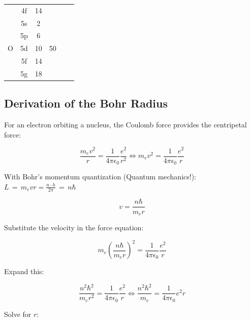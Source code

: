 \documentclass[
	a4paper,
	parskip=half,
    pagesize=auto,      		%
    listof=totoc,   		%
    bibliography=totoc,
	11pt
]{scrartcl}
\begin{document}
\begin{table}[htp]
\begin{tabular}{cccccc}
		& 4f & 14 &                     & \multicolumn{1}{l}{} & \multicolumn{1}{l}{} \\
		\multirow{5}{*}{O} & 5s & 2  & \multirow{5}{*}{50} & \multicolumn{1}{l}{} & \multicolumn{1}{l}{} \\ \addlinespace
		& 5p & 6  &                     & \multicolumn{1}{l}{} & \multicolumn{1}{l}{} \\
		& 5d & 10 &                     & \multicolumn{1}{l}{} & \multicolumn{1}{l}{} \\
		& 5f & 14 &                     & \multicolumn{1}{l}{} & \multicolumn{1}{l}{} \\
		& 5g & 18 &                     & \multicolumn{1}{l}{} & \multicolumn{1}{l}{} \\ \bottomrule 
	\end{tabular}
\end{table}

\subsection{Derivation of the Bohr Radius} \label{ch:bohr-eq}

For an electron orbiting a nucleus, the Coulomb force provides the centripetal force:

\begin{equation}
	\frac{m_e v^2}{r} = \frac{1}{4\pi\epsilon_0}\frac{e^2}{r^2} \iff m_e v^2 = \frac{1}{4\pi\epsilon_0}\frac{e^2}{r}
\end{equation}


With Bohr's momentum quantization (Quantum mechanics!): $L \, = \, m_e v r = \frac{n \cdot h}{2 \pi} \, = \, n \hbar$


\begin{equation}
	v = \frac{n\hbar}{m_e r}
\end{equation}

Substitute the velocity in the force equation:

\begin{equation}
	m_e \left(\frac{n\hbar}{m_e r}\right)^2
	=
	\frac{1}{4\pi\epsilon_0}\frac{e^2}{r}
\end{equation}

Expand this:

\begin{equation}
	\frac{n^2 \hbar^2}{m_e r^2}
	=
	\frac{1}{4\pi\epsilon_0}\frac{e^2}{r} \iff \frac{n^2 \hbar^2}{m_e}
	=
	\frac{1}{4\pi\epsilon_0} e^2 r
\end{equation}

Solve for $r$:
\end{document}
